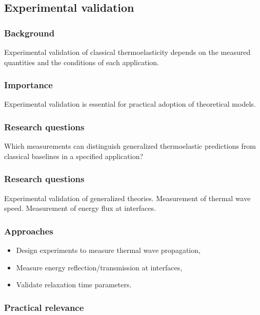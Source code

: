 \subsection{Experimental validation}
\label{sec:experimental-validation}

\subsubsection{Background}

Experimental validation of classical thermoelasticity depends on the measured quantities and the conditions of each application.

\subsubsection{Importance}

Experimental validation is essential for practical adoption of theoretical models.

\subsubsection{Research questions}

Which measurements can distinguish generalized thermoelastic predictions from classical baselines in a specified application?

\subsubsection{Research questions}

Experimental validation of generalized theories. Measurement of thermal wave speed. Measurement of energy flux at interfaces.

\subsubsection{Approaches}

\begin{itemize}
\item Design experiments to measure thermal wave propagation,
\item Measure energy reflection/transmission at interfaces,
\item Validate relaxation time parameters.
\end{itemize}

\subsubsection{Practical relevance}

